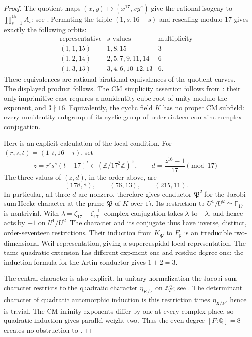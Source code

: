 \begin{proof}
The quotient maps $(x,y)\mapsto(x^{17},xy^s)$ give the rational
isogeny to $\prod_{s=1}^{15}A_s$; see \citet[\S2, pp.~207--208]{GrossRohrlich1978}.  Permuting the triple $(1,s,16-s)$ and
rescaling modulo $17$ gives exactly the following orbits:
\[
 \begin{array}{c|c|c}
 \text{representative}&s\text{-values}&\text{multiplicity}\\ \hline
 (1,1,15)&1,8,15&3\\
 (1,2,14)&2,5,7,9,11,14&6\\
 (1,3,13)&3,4,6,10,12,13&6.
 \end{array}
\]
These equivalences are rational birational equivalences of the
quotient curves.  The displayed product follows.
The CM simplicity assertion follows from \citet[Lemma~1.6 and the following remark, pp.~206--207]{GrossRohrlich1978}: their only
imprimitive case requires a nonidentity cube root of unity modulo
the exponent, and $3\nmid16$.  Equivalently, the cyclic field
$K$ has no proper CM subfield: every nonidentity subgroup of its
cyclic group of order sixteen contains complex conjugation.

Here is an explicit calculation of the local condition.  For
$(r,s,t)=(1,i,16-i)$, set
\[
 z=r^r s^s(t-17)^t\in(\mathbb Z/17^2\mathbb Z)^\times,
 \qquad d=\frac{z^{16}-1}{17}\pmod {17}.
\]
The three values of $(z,d)$, in the order above, are
\[
 (178,8),\qquad(76,13),\qquad(215,11).
\]
In particular, all three $d$ are nonzero.  \citet[Proposition~3.12(2), author p.~16]{ShuExpanded2021} therefore gives conductor
$\mathfrak P^2$ for the Jacobi-sum Hecke character at the prime
$\mathfrak P$ of $K$ over $17$.  Its restriction to
$U^1/U^2\simeq\mathbb F_{17}$ is nontrivial.  With
$\lambda=\zeta_{17}-\zeta_{17}^{-1}$, complex conjugation takes
$\lambda$ to $-\lambda$, and hence acts by $-1$ on $U^1/U^2$.
The character and its conjugate thus have inverse, distinct,
order-seventeen restrictions.  Their induction from $K_{\mathfrak P}$
to $F_{\mathfrak p}$ is an irreducible two-dimensional Weil
representation, giving a supercuspidal local representation.
The tame quadratic extension has different exponent one and residue
degree one; the induction formula for the Artin conductor gives
$1+2=3$.

The central character is also explicit.  In unitary normalization
the Jacobi-sum character restricts to the quadratic character
$\eta_{K/F}$ on $\mathbb A_F^\times$; see \citet[\S3.4, author p.~15]{ShuExpanded2021}.  The determinant character of quadratic automorphic
induction is this restriction times $\eta_{K/F}$, hence is trivial.
The CM infinity exponents differ by one at every complex place,
so quadratic induction gives parallel weight two.  Thus the even
degree $[F:\mathbb Q]=8$ creates no obstruction to
\citet[Theorem~B(b), p.~593]{Nekovar2012}.


\end{proof}

